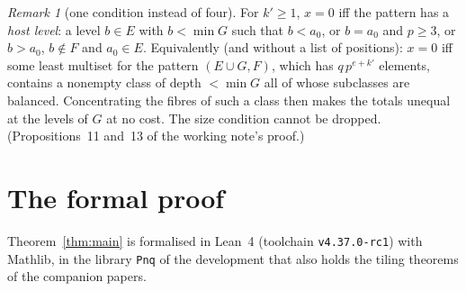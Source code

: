 \documentclass[11pt,a4paper]{amsart}
\theoremstyle{definition}
\theoremstyle{remark}
\newtheorem{remark}[theorem]{Remark}
\newcommand{\lean}[1]{\texttt{#1}}
\begin{document}
\begin{remark}[one condition instead of four]
For $k'\ge1$, $x=0$ iff the pattern has a \emph{host level}: a level $b\in E$ with $b<\min G$ such that
$b<a_0$, or $b=a_0$ and $p\ge3$, or $b>a_0$, $b\notin F$ and $a_0\in E$. Equivalently (and without a list of
positions): $x=0$ iff some least multiset for the pattern $(E\cup G,F)$, which has $q\,p^{e+k'}$ elements,
contains a nonempty class of depth $<\min G$ all of whose subclasses are balanced. Concentrating the fibres
of such a class then makes the totals unequal at the levels of $G$ at no cost. The size condition cannot be
dropped. (Propositions~11 and~13 of the working note's proof.)
\end{remark}

\section{The formal proof}\label{sec:lean}

Theorem~\ref{thm:main} is formalised in Lean~4 (toolchain \lean{v4.37.0-rc1}) with Mathlib, in the library
\lean{Pnq} of the development that also holds the tiling theorems of the companion papers. %
\end{document}

